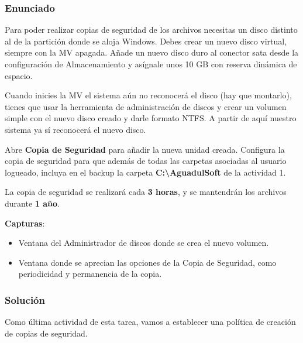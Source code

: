 \subsubsection{Enunciado}
Para poder realizar copias de seguridad de los archivos necesitas un disco distinto al de la partición donde se aloja Windows. Debes crear un nuevo disco virtual, siempre con la MV apagada. Añade un nuevo disco duro al conector sata desde la configuración de Almacenamiento y asígnale unos 10 GB con reserva dinámica de espacio.

Cuando inicies la MV el sistema aún no reconocerá el disco (hay que montarlo), tienes que usar la herramienta de administración de discos y crear un volumen simple con el nuevo disco creado y darle formato NTFS. A partir de aquí nuestro sistema ya sí reconocerá el nuevo disco.

Abre \textbf{Copia de Seguridad} para añadir la nueva unidad creada. Configura la copia de seguridad para que además de todas las carpetas asociadas al usuario logueado, incluya en el backup la carpeta \textbf{C:\textbackslash AguadulSoft} de la actividad 1.

La copia de seguridad se realizará cada \textbf{3 horas}, y se mantendrán los archivos durante \textbf{1 año}.

\textbf{Capturas}:

\begin{itemize}
    \item Ventana del Administrador de discos donde se crea el nuevo volumen.
    \item Ventana donde se aprecian las opciones de la Copia de Seguridad, como periodicidad y permanencia de la copia.
\end{itemize}

\subsubsection{Solución}
Como última actividad de esta tarea, vamos a establecer una política de creación de copias de seguridad.

